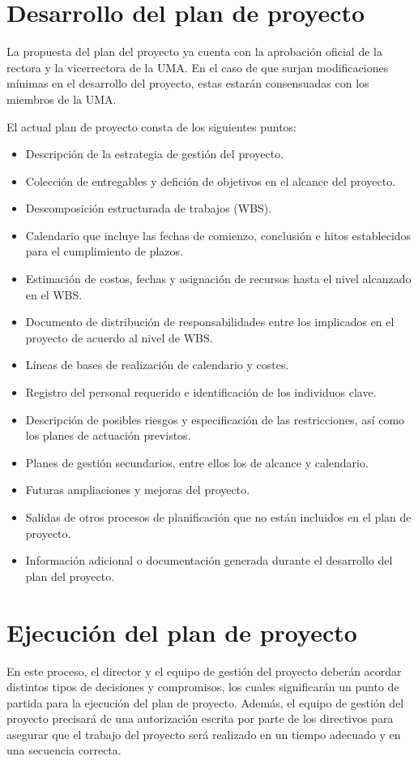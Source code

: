 \documentclass[11pt,a4paper,spanish,twoside]{report}
\begin{document}
\section{Desarrollo del plan de proyecto}
La propuesta del plan del proyecto ya cuenta con la aprobación oficial de la 
rectora y la vicerrectora de la UMA. En el caso de que surjan modificaciones
mínimas en el desarrollo del proyecto, estas estarán consensuadas con los
miembros de la UMA.

El actual plan de proyecto consta de los siguientes puntos:
\begin{itemize}
\item Descripción de la estrategia de gestión del proyecto.
\item Colección de entregables y defición de objetivos en el alcance del 
proyecto.
\item Descomposición estructurada de trabajos (WBS).
\item Calendario que incluye las fechas de comienzo, conclusión e hitos 
establecidos para el cumplimiento de plazos.
\item Estimación de costos, fechas y asignación de recursos hasta el nivel 
alcanzado en el WBS.
\item Documento de distribución de responsabilidades entre los implicados
en el proyecto de acuerdo al nivel de WBS.
\item Líneas de bases de realización de calendario y costes.
\item Registro del personal requerido e identificación de los individuos 
clave.
\item Descripción de posibles riesgos y especificación de las restricciones,
así como los planes de actuación previstos.
\item Planes de gestión secundarios, entre ellos los de alcance y calendario.
\item Futuras ampliaciones y mejoras del proyecto.
\item Salidas de otros procesos de planificación que no están incluidos en el 
plan de proyecto.
\item Información adicional o documentación generada durante el desarrollo del
plan del proyecto.  
\end{itemize}
\section{Ejecución del plan de proyecto}
En este proceso, el director y el equipo de gestión del proyecto deberán 
acordar distintos tipos de decisiones y compromisos, los cuales significarán 
un punto de partida para la ejecución del plan de proyecto. Además, el equipo 
de gestión del proyecto precisará de una autorización escrita por parte de los 
directivos para asegurar que el trabajo del proyecto será realizado en un 
tiempo adecuado y en una secuencia correcta.
\end{document}
